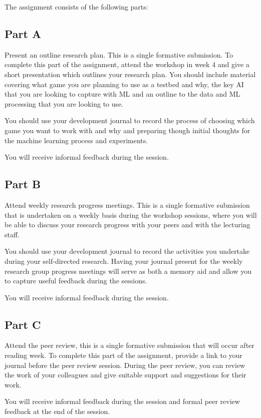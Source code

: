 \documentclass{../common/fal_assignment}
\begin{document}
The assignment consists of the following parts:

\subsection*{Part A}
Present an outline research plan. This is a single formative submission. To complete this part of the assignment, attend the workshop in week 4 and give a short presentation which outlines your research plan. You should include material covering what game you are planning to use as a testbed and why, the key AI that you are looking to capture with ML and an outline to the data and ML processing that you are looking to use.

You should use your development journal to record the process of choosing which game you want to work with and why and preparing though initial thoughts for the machine learning process and experiments.

You will receive informal feedback during the session.

\subsection*{Part B}
Attend weekly research progress meetings. This is a single formative submission that is undertaken on a weekly basis during the workshop sessions, where you will be able to discuss your research progress with your peers and with the lecturing staff.

You should use your development journal to record the activities you undertake during your self-directed research. Having your journal present for the weekly research group progress meetings will serve as both a memory aid and allow you to capture useful feedback during the sessions.

You will receive informal feedback during the session.

\subsection*{Part C}
Attend the peer review, this is a single formative submission that will occur after reading week. To complete this part of the assignment, provide a link to your journal before the  peer review session. During the peer review, you can review the work of your colleagues and give suitable support and suggestions for their work.

You will receive informal feedback during the session and formal peer review feedback at the end of the session.
\end{document}
